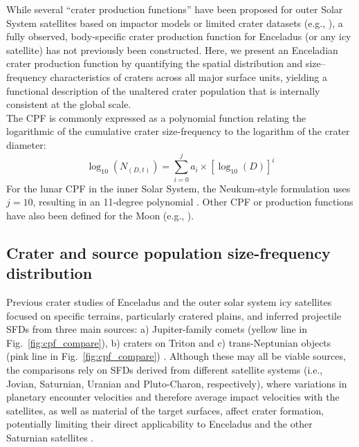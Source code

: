 \documentclass[preprint,11pt,3p,times,authoryear]{elsarticle}
\begin{document}
While several ``crater production functions'' have been proposed for outer Solar System satellites based on impactor models or limited crater datasets (e.g., \citealt{Zahnle2003, Kirchoff2009, Singer2019, Wong2023}), a fully observed, body-specific crater production function for Enceladus (or any icy satellite) has not previously been constructed. Here, we present an Enceladian crater production function by quantifying the spatial distribution and size–frequency characteristics of craters across all major surface units, yielding a functional description of the unaltered crater population that is internally consistent at the global scale. \\

The CPF is commonly expressed as a polynomial function relating the logarithmic of the cumulative crater size-frequency to the logarithm of the crater diameter:
\begin{equation}
  \log_{10}(N_{(D,t)}) = \sum_{i=0}^{j} a_{i} \times [\log_{10}(D)]^i
\end{equation}
For the lunar CPF in the inner Solar System, the Neukum-style formulation uses $j = 10$, resulting in an 11-degree polynomial \citep{Neukum2001}. Other CPF or production functions have also been defined for the Moon (e.g., \citealt{Marchi2009}).\\

\subsection{Crater and source population size-frequency distribution}
Previous crater studies of Enceladus and the outer solar system icy satellites focused on specific terrains, particularly cratered plains, and inferred projectile SFDs from three main sources:
a) Jupiter-family comets (yellow line in Fig.~\ref{fig:cpf_compare}), b) craters on Triton 
and c) trans-Neptunian objects (pink line in Fig.~\ref{fig:cpf_compare}) \citep{Zahnle2003, Singer2019, Bottke2024}.
Although these may all be viable sources, the comparisons rely on SFDs derived from different satellite systems (i.e., Jovian, Saturnian, Uranian and Pluto-Charon, respectively), where variations in planetary encounter velocities and therefore average impact velocities with the satellites, as well as material of the target surfaces, affect crater formation, potentially limiting their direct applicability to Enceladus and the other Saturnian satellites \citep{Neukum1983,Zahnle2003,DiSisto2007,DiSisto2011,DiSisto2013,DiSisto2016,Rossignoli2019,DiSisto2020,Rossignoli2022}.\\
\end{document}
